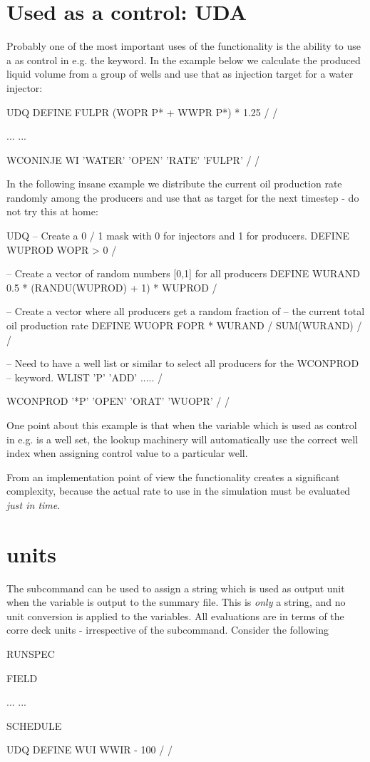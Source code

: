\section{Used as a control: UDA}
\label{uda}
Probably one of the most important uses of the \udq{} functionality is the
ability to use a \udq{} as control in e.g. the  keyword. In the
example below we calculate the produced liquid volume from a group of wells and
use that as injection target for a water injector:

\begin{deck}
UDQ
  DEFINE FULPR  (WOPR P* + WWPR P*) * 1.25 /
/

...
...

WCONINJE
  WI  'WATER'  'OPEN'  'RATE'   'FULPR' /
/
\end{deck}

In the following insane example we distribute the current oil production rate
randomly among the producers and use that as target for the next timestep - do
not try this at home:
\begin{deck}
UDQ
  -- Create a 0 / 1 mask with 0 for injectors and 1 for producers.
  DEFINE WUPROD WOPR > 0 /
  
  -- Create a vector of random numbers [0,1] for all producers
  DEFINE WURAND 0.5 * (RANDU(WUPROD) + 1) * WUPROD /

  -- Create a vector where all producers get a random fraction of
  -- the current total oil production rate
  DEFINE WUOPR FOPR * WURAND / SUM(WURAND) /
/

-- Need to have a well list or similar to select all producers for the WCONPROD
-- keyword.
WLIST
  'P' 'ADD' ..... /


WCONPROD
 '*P' 'OPEN' 'ORAT'  'WUOPR' /
/
\end{deck}
One point about this example is that when the \udq{} variable which is used as
control in e.g.  is a well set, the lookup machinery will
automatically use the correct well index when assigning control value to a
particular well.

From an implementation point of view the  functionality creates a
significant complexity, because the actual rate to use in the simulation must be
evaluated \emph{just in time}.

\section{\udq{} units}
\label{udq_units}
The \udq{} subcommand  can be used to assign a string which is used as
output unit when the \udq{} variable is output to the summary file. This is
\emph{only} a string, and no unit conversion is applied to the \udq{} variables.
All \udq{} evaluations are in terms of the corre deck units - irrespective of the
 subcommand. Consider the following
\begin{deck}
RUNSPEC

FIELD

...
...

SCHEDULE

UDQ
  DEFINE WUI WWIR - 100 /
/
\end{deck}

